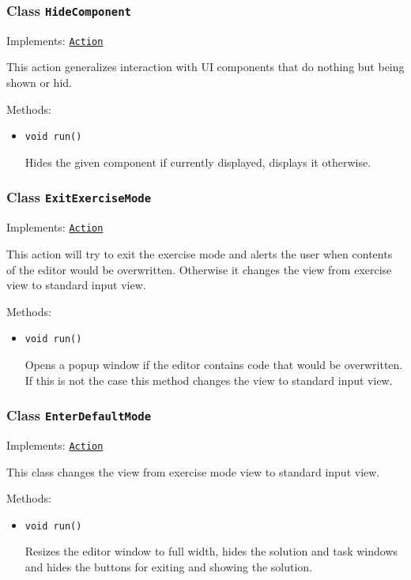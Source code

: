 \subsubsection{Class \texttt{HideComponent}}
\label{type:edu.kit.wavelength.client.view.action.HideComponent}
Implements: \texttt{\hyperref[type:edu.kit.wavelength.client.view.action.Action]{Action}}

This action generalizes interaction with UI components that do nothing but
 being shown or hid.

Methods:
\begin{itemize}
\item \texttt{void run()}

Hides the given component if currently displayed, displays it otherwise.

\end{itemize}

\subsubsection{Class \texttt{ExitExerciseMode}}
\label{type:edu.kit.wavelength.client.view.action.ExitExerciseMode}
Implements: \texttt{\hyperref[type:edu.kit.wavelength.client.view.action.Action]{Action}}

This action will try to exit the exercise mode and alerts the user when
 contents of the editor would be overwritten. Otherwise it changes the view
 from exercise view to standard input view.

Methods:
\begin{itemize}
\item \texttt{void run()}

Opens a popup window if the editor contains code that would be overwritten.
 If this is not the case this method changes the view to standard input view.

\end{itemize}

\subsubsection{Class \texttt{EnterDefaultMode}}
\label{type:edu.kit.wavelength.client.view.action.EnterDefaultMode}
Implements: \texttt{\hyperref[type:edu.kit.wavelength.client.view.action.Action]{Action}}

This class changes the view from exercise mode view to standard input view.

Methods:
\begin{itemize}
\item \texttt{void run()}

Resizes the editor window to full width, hides the solution and task windows
 and hides the buttons for exiting and showing the solution.

\end{itemize}

